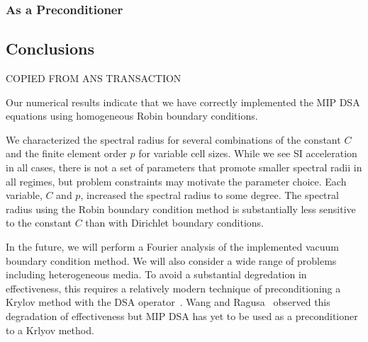 \documentclass[12pt]{article}
\begin{document}
\subsubsection{As a Preconditioner}

\subsection{Conclusions}
{\color{red}COPIED FROM ANS TRANSACTION}
{\color{blue}
Our numerical results indicate that we have correctly implemented the MIP DSA equations using homogeneous Robin boundary conditions.

We characterized the spectral radius for several combinations of the constant $C$ and the finite element order $p$ for variable cell sizes. While we see SI acceleration in all cases, there is not a set of parameters that promote smaller spectral radii in all regimes, but problem constraints may motivate the parameter choice. Each variable, $C$ and $p$, increased the spectral radius to some degree. The spectral radius using the Robin boundary condition method is substantially less sensitive to the constant $C$ than with Dirichlet boundary conditions.

In the future, we will perform a Fourier analysis of the implemented vacuum boundary condition method. We will also consider a wide range of problems including heterogeneous media. To avoid a substantial degredation in effectiveness, this requires a relatively modern technique of preconditioning a Krylov method with the DSA operator~\cite{WarsaKrylovDSA}. Wang and Ragusa~\cite{WangRagusaDSA} observed this degradation of effectiveness but MIP DSA has yet to be used as a preconditioner to a Krlyov method.
}

%
%
\end{document}
